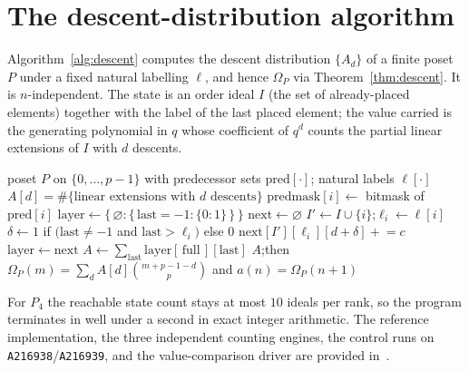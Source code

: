 \documentclass[11pt]{article}
\theoremstyle{plain}
\theoremstyle{definition}
\theoremstyle{remark}
\newcommand{\OEIS}[1]{\texttt{#1}}
\newcommand{\Om}{\Omega}
\begin{document}
\appendix

\section{The descent-distribution algorithm}\label{app:alg}

Algorithm~\ref{alg:descent} computes the descent distribution $\{A_d\}$ of a finite poset $P$
under a fixed natural labelling $\ell$, and hence $\Om_P$ via Theorem~\ref{thm:descent}. It is
$n$-independent. The state is an order ideal $I$ (the set of already-placed elements) together
with the label of the last placed element; the value carried is the generating polynomial in
$q$ whose coefficient of $q^d$ counts the partial linear extensions of $I$ with $d$ descents.

\begin{algorithm}[ht]
\caption{Descent distribution of a finite poset $P$.}\label{alg:descent}
\begin{algorithmic}[1]
\Require poset $P$ on $\{0,\dots,p-1\}$ with predecessor sets $\mathrm{pred}[\cdot]$; natural labels $\ell[\cdot]$
\Ensure $A[d]=\#\{\text{linear extensions with } d \text{ descents}\}$
\State $\mathrm{predmask}[i]\gets$ bitmask of $\mathrm{pred}[i]$ 
\State $\mathrm{layer}\gets\{\,\varnothing:\{\,\mathrm{last}=-1:\{0:1\}\,\}\,\}$ 
  \State $\mathrm{next}\gets\varnothing$
     
      \State $I'\gets I\cup\{i\}$;\quad $\ell_i\gets\ell[i]$
        \State $\delta\gets 1$ if $(\mathrm{last}\neq-1$ and $\mathrm{last}>\ell_i)$ else $0$
          \State $\mathrm{next}[I'][\ell_i][d+\delta]\mathrel{+}=c$
        \EndFor
      \EndFor
    \EndFor
  \EndFor
  \State $\mathrm{layer}\gets\mathrm{next}$
\EndFor
\State $A\gets\sum_{\mathrm{last}}\mathrm{layer}[\,\text{full}\,][\mathrm{last}]$ 
\State \Return $A$;\quad then $\Om_P(m)=\sum_d A[d]\binom{m+p-1-d}{p}$ and $a(n)=\Om_P(n+1)$
\end{algorithmic}
\end{algorithm}

For $P_4$ the reachable state count stays at most $10$ ideals per rank, so the program
terminates in well under a second in exact integer arithmetic. The reference implementation,
the three independent counting engines, the control runs on \OEIS{A216938}/\OEIS{A216939}, and
the value-comparison driver are provided in~\cite{REPO}.
\end{document}
